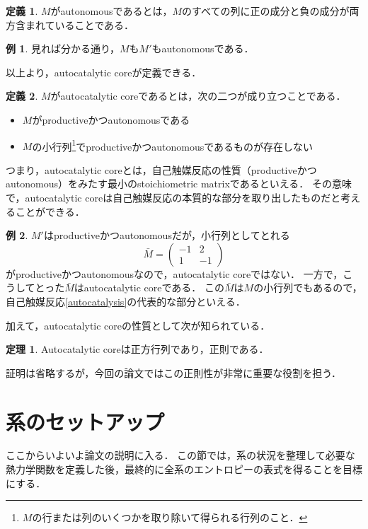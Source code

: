 \documentclass[a4paper,11pt]{jsarticle}
\theoremstyle{definition}
\newtheorem{thm}{定理}
\newtheorem{dfn}{定義}
\newtheorem{ex}{例}
\begin{document}
\begin{dfn}
  $M$がautonomousであるとは，$M$のすべての列に正の成分と負の成分が両方含まれていることである．
\end{dfn}
\begin{ex}
  見れば分かる通り，$M$も$M'$もautonomousである．
\end{ex}
以上より，autocatalytic coreが定義できる．
\begin{dfn}
  $M$がautocatalytic coreであるとは，次の二つが成り立つことである．
  \begin{itemize}
    \item $M$がproductiveかつautonomousである
    \item $M$の小行列\footnote{$M$の行または列のいくつかを取り除いて得られる行列のこと．}でproductiveかつautonomousであるものが存在しない
  \end{itemize}
\end{dfn}
つまり，autocatalytic coreとは，自己触媒反応の性質（productiveかつautonomous）をみたす最小のstoichiometric matrixであるといえる．
その意味で，autocatalytic coreは自己触媒反応の本質的な部分を取り出したものだと考えることができる．
\begin{ex}
  $M'$はproductiveかつautonomousだが，小行列としてとれる
\begin{equation}
  \bar{M} = \left(
    \begin{matrix}
      -1 & 2 \\
      1 & -1
    \end{matrix}
  \right)
\end{equation}
がproductiveかつautonomousなので，autocatalytic coreではない．
一方で，こうしてとった$\bar{M}$はautocatalytic coreである．
この$\bar{M}$は$M$の小行列でもあるので，自己触媒反応\eqref{autocatalysis}の代表的な部分といえる．
\end{ex}

加えて，autocatalytic coreの性質として次が知られている．
\begin{thm}
  Autocatalytic coreは正方行列であり，正則である．
\end{thm}
証明は省略するが，今回の論文ではこの正則性が非常に重要な役割を担う．

\section{系のセットアップ}
ここからいよいよ論文の説明に入る．
この節では，系の状況を整理して必要な熱力学関数を定義した後，最終的に全系のエントロピーの表式を得ることを目標にする．
\end{document}
